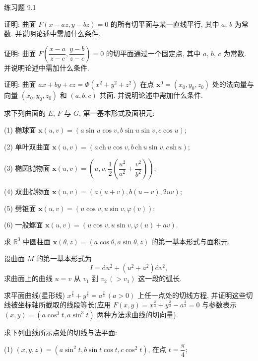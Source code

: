 \begin{exblock}{练习题 9.1}
  \item 证明: 曲面 $F(x - az, y - bz) = 0$ 的所有切平面与某一直线平行, 其中 $a$, $b$ 为常数. 并说明论述中需加什么条件.

  \item 证明: 曲面 $F\left(\dfrac{x-a}{z-c}, \dfrac{y-b}{z-c}\right) = 0$ 的切平面通过一个固定点, 其中 $a$, $b$, $c$ 为常数. 并说明论述中需加什么条件.

  \item 证明: 曲面 $ax + by + cz = \Phi(x^{2} + y^{2} + z^{2})$ 在点 $\boldsymbol{x}^{0} = (x_{0}, y_{0}, z_{0})$ 处的法向量与向量 $(x_{0}, y_{0}, z_{0})$ 和 $(a, b, c)$ 共面. 并说明论述中需加什么条件.

  \item 求下列曲面的 $E$, $F$ 与 $G$, 第一基本形式及面积元:

  (1) 椭球面 $\boldsymbol{x}(u, v) = (a\sin u\cos v, b\sin u\sin v, c\cos u)$;

  (2) 单叶双曲面 $\boldsymbol{x}(u, v) = (a\,\mathrm{ch}\,u\cos v, b\,\mathrm{ch}\,u\sin v, c\,\mathrm{sh}\,u)$;

  (3) 椭圆抛物面 $\boldsymbol{x}(u, v) = \left(u, v, \dfrac{1}{2}\left(\dfrac{u^{2}}{a^{2}} + \dfrac{v^{2}}{b^{2}}\right)\right)$;

  (4) 双曲抛物面 $\boldsymbol{x}(u, v) = (a(u + v), b(u - v), 2uv)$;

  (5) 劈锥面 $\boldsymbol{x}(u, v) = (u\cos v, u\sin v, \varphi(v))$;

  (6) 一般螺面 $\boldsymbol{x}(u, v) = (u\cos v, u\sin v, \varphi(u) + av)$.

  \item 求 $\mathbb{R}^{3}$ 中圆柱面 $\boldsymbol{x}(\theta, z) = (a\cos\theta, a\sin\theta, z)$ 的第一基本形式与面积元.

  \item 设曲面 $M$ 的第一基本形式为
  \[ I = \mathrm{d}u^{2} + (u^{2} + a^{2})\mathrm{d}v^{2}, \]
  求曲面上的曲线 $u = v$ 从 $v_{1}$ 到 $v_{2}\,(> v_{1})$ 这一段的弧长.

  \item 求平面曲线(星形线) $x^{\frac{2}{3}} + y^{\frac{2}{3}} = a^{\frac{2}{3}}\,(a > 0)$ 上任一点处的切线方程, 并证明这些切线被坐标轴所截取的线段等长(应用 $F(x, y) = x^{\frac{2}{3}} + y^{\frac{2}{3}} - a^{\frac{2}{3}} = 0$ 与参数表示 $(x, y) = (a\cos^{3}t, a\sin^{3}t)$ 两种方法求曲线的切向量).

  \item 求下列曲线所示点处的切线与法平面:

  (1) $(x, y, z) = (a\sin^{2}t, b\sin t\cos t, c\cos^{2}t)$, 在点 $t = \dfrac{\pi}{4}$;


\end{exblock}
